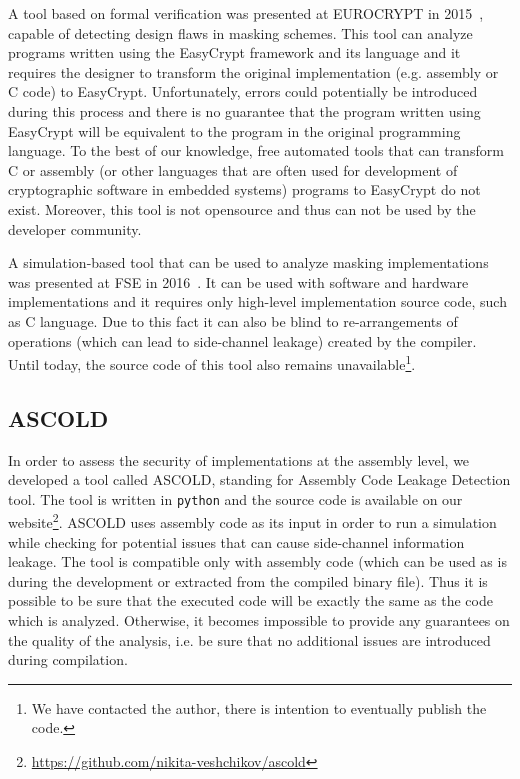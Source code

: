 A tool based on formal verification 
was presented at EUROCRYPT in 2015~\cite{DBLP:conf/eurocrypt/BartheBDFGS15},
capable of detecting design flaws in masking schemes.
This tool can analyze programs written using the EasyCrypt framework and its language and
it requires the designer to transform the original implementation (e.g. assembly or C code)
to EasyCrypt. Unfortunately, errors could potentially be introduced during this process
and there is no guarantee that the program written using EasyCrypt will be equivalent
to the program in the original programming language. To the best of our knowledge, 
free automated tools that can transform C or assembly 
(or other languages that are often used for development of cryptographic software in embedded systems) 
programs to EasyCrypt do not exist.
Moreover, this tool is not opensource and thus can not be used by the developer community.

A simulation-based tool that can be used to analyze masking implementations
was presented at FSE in 2016~\cite{DBLP:conf/fse/Reparaz16}.
It can be used with software and hardware implementations
and it requires only high-level implementation source code, such as C language.
Due to this fact it can also be blind to re-arrangements of operations 
(which can lead to side-channel leakage) created by the compiler.
Until today, the source code of this tool also remains 
unavailable\footnote{We have contacted the author, there is intention to eventually publish the code.}.

\subsection{ASCOLD}\label{subsec:ascold}

In order to assess the security of implementations at the assembly level, we developed a tool called ASCOLD, standing for Assembly Code Leakage Detection tool.
The tool is written in \texttt{python} and the source code is available on our 
website\footnote{\url{https://github.com/nikita-veshchikov/ascold}}.
ASCOLD uses assembly code as its input in order to run a simulation while checking for potential
issues that can cause side-channel information leakage.
The tool is compatible only with assembly code 
(which can be used as is during the development or extracted from the compiled binary file). 
Thus it is possible to be sure that the executed code will be exactly the same as the code
which is analyzed. Otherwise, it becomes impossible to provide any guarantees
on the quality of the analysis, i.e. be sure that no additional issues are introduced during compilation.

